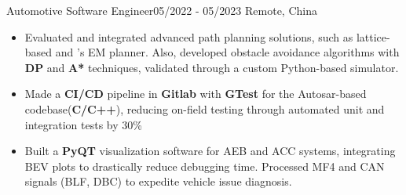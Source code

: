 \resumeSubheadingReza
{Automotive Software Engineer}{05/2022 - 05/2023}
{}{Remote, China}
{
  
  \vspace{-12pt}
    \begin{itemize}
      \item {Evaluated and integrated advanced path planning solutions, such as lattice-based and 's EM planner. Also, developed obstacle avoidance algorithms with \textbf{DP} and \textbf{A*} techniques, validated through a custom Python-based simulator.}
      \item {Made a \textbf{CI/CD} pipeline in \textbf{Gitlab} with \textbf{GTest} for the Autosar-based codebase(\textbf{C/C++}), reducing on-field testing through automated unit and integration tests by 30\%}
      \item {Built a \textbf{PyQT} visualization software for AEB and ACC systems, integrating BEV plots to drastically reduce debugging time. Processed MF4 and CAN signals (BLF, DBC) to expedite vehicle issue diagnosis.}
  \end{itemize}
}